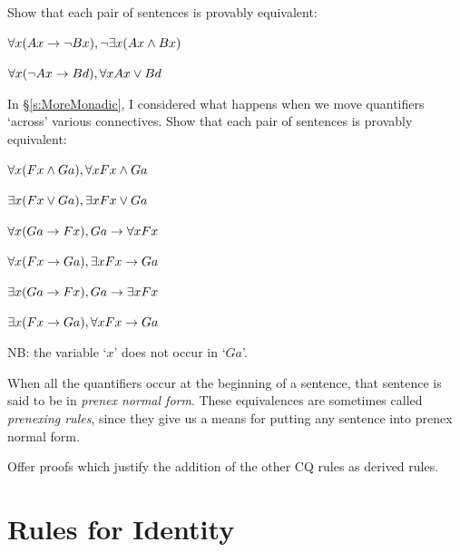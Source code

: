 \problempart
Show that each pair of sentences is provably equivalent:
\begin{earg}
\item $\forall x (Ax\rightarrow \neg Bx), \neg\exists x(Ax \wedge Bx)$
\item $\forall x (\neg Ax\rightarrow Bd), \forall x Ax \vee Bd$
\end{earg}

\problempart
In §\ref{s:MoreMonadic}, I considered what happens when we move quantifiers `across' various connectives. Show that each pair of sentences is provably equivalent:
\begin{earg}
\item $\forall x (Fx \wedge Ga), \forall x Fx \wedge Ga$
\item $\exists x (Fx \vee Ga), \exists x Fx \vee Ga$
\item $\forall x(Ga \rightarrow Fx), Ga \rightarrow \forall x Fx$
\item $\forall x(Fx \rightarrow Ga), \exists x Fx \rightarrow Ga$
\item $\exists x(Ga \rightarrow Fx), Ga \rightarrow \exists x Fx$
\item $\exists x(Fx \rightarrow Ga), \forall x Fx \rightarrow Ga$
\end{earg}
NB: the variable `$x$' does not occur in `$Ga$'.

When all the quantifiers occur at the beginning of a sentence, that sentence is said to be in \emph{prenex normal form}. These equivalences are sometimes called \emph{prenexing rules}, since they give us a means for putting any sentence into prenex normal form.



\problempart
Offer proofs which justify the addition of the other CQ rules as derived rules.



\chapter{Rules for Identity}\label{ch.identity}

